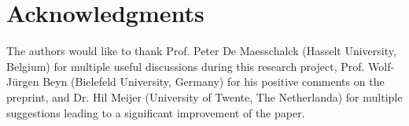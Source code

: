 \section*{Acknowledgments}
The authors would like to thank Prof. Peter De Maesschalck (Hasselt University,
Belgium) for multiple useful discussions during this research project, Prof.
Wolf-J\"urgen Beyn (Bielefeld University, Germany) for his positive comments on
the preprint, and Dr. Hil Meijer (University of Twente, The Netherlanda) for
multiple suggestions leading to a significant improvement of the paper.
